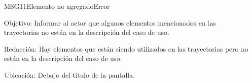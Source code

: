 \begin{mensaje}{MSG11}{Elemento no agregado}{Error}
	\item [Objetivo:] Informar al actor que algunos elementos mencionados en las trayectorias no están en la descripción del caso de uso.
	\item[Redacción:] Hay elementos que están siendo utilizados en las trayectorias pero no están en la descripción del caso de uso.
	\item [Ubicación:] Debajo del título de la pantalla.
\end{mensaje}